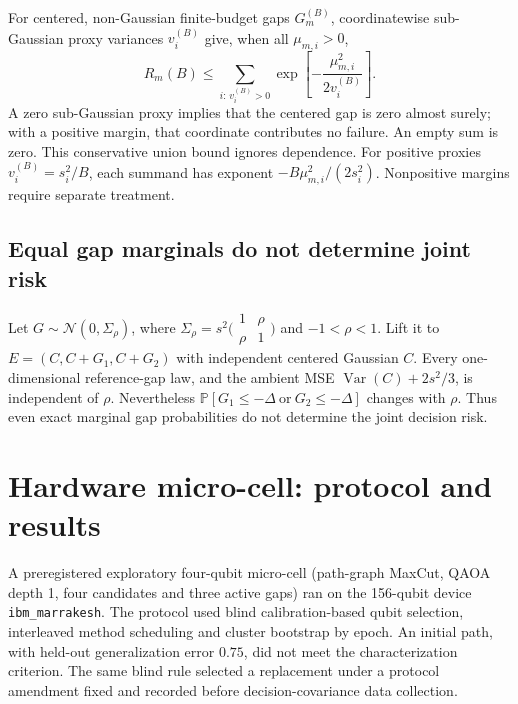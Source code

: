 \documentclass[a4paper,onecolumn,unpublished,nopdfoutputerror]{quantumarticle}
\theoremstyle{plain}
\theoremstyle{definition}
\newcommand{\Prob}{\mathbb{P}}
\newcommand{\Var}{\operatorname{Var}}
\newcommand{\calN}{\mathcal{N}}
\newcommand{\1}{\mathbf{1}}
\begin{document}
For centered, non-Gaussian finite-budget gaps $G_m^{(B)}$, coordinatewise sub-Gaussian proxy variances $v_i^{(B)}$ give, when all $\mu_{m,i}>0$,
\begin{equation}
R_m(B)\le\sum_{i:\,v_i^{(B)}>0}\exp\!\left[-\frac{\mu_{m,i}^2}{2v_i^{(B)}}\right].
\end{equation}
A zero sub-Gaussian proxy implies that the centered gap is zero almost surely; with a positive margin, that coordinate contributes no failure. An empty sum is zero. This conservative union bound ignores dependence. For positive proxies $v_i^{(B)}=s_i^2/B$, each summand has exponent $-B\mu_{m,i}^2/(2s_i^2)$. Nonpositive margins require separate treatment.

\subsection{Equal gap marginals do not determine joint risk}
\label{app:joint_witnesses}

Let $G\sim\calN(0,\Sigma_\rho)$, where $\Sigma_\rho=s^2\bigl(\begin{smallmatrix}1&\rho\\\rho&1\end{smallmatrix}\bigr)$ and $-1<\rho<1$. Lift it to $E=(C,C+G_1,C+G_2)$ with independent centered Gaussian $C$. Every one-dimensional reference-gap law, and the ambient MSE $\Var(C)+2s^2/3$, is independent of $\rho$. Nevertheless $\Prob[G_1\le-\Delta\ \text{or}\ G_2\le-\Delta]$ changes with $\rho$. Thus even exact marginal gap probabilities do not determine the joint decision risk.

\section{Hardware micro-cell: protocol and results}
\label{app:hardware_microcell}

A preregistered exploratory four-qubit micro-cell (path-graph MaxCut, QAOA depth 1, four candidates and three active gaps) ran on the 156-qubit device \texttt{ibm\_marrakesh}. The protocol used blind calibration-based qubit selection, interleaved method scheduling and cluster bootstrap by epoch. An initial path, with held-out generalization error $0.75$, did not meet the characterization criterion. The same blind rule selected a replacement under a protocol amendment fixed and recorded before decision-covariance data collection.
\end{document}
